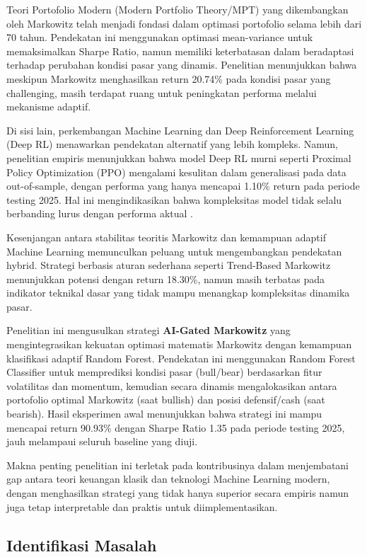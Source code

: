 \documentclass[12pt,a4paper]{article}
\begin{document}
Teori Portofolio Modern (Modern Portfolio Theory/MPT) yang dikembangkan oleh Markowitz \cite{markowitz1952portfolio} telah menjadi fondasi dalam optimasi portofolio selama lebih dari 70 tahun. Pendekatan ini menggunakan optimasi mean-variance untuk memaksimalkan Sharpe Ratio, namun memiliki keterbatasan dalam beradaptasi terhadap perubahan kondisi pasar yang dinamis. Penelitian menunjukkan bahwa meskipun Markowitz menghasilkan return 20.74\% pada kondisi pasar yang challenging, masih terdapat ruang untuk peningkatan performa melalui mekanisme adaptif.

Di sisi lain, perkembangan Machine Learning dan Deep Reinforcement Learning (Deep RL) menawarkan pendekatan alternatif yang lebih kompleks. Namun, penelitian empiris menunjukkan bahwa model Deep RL murni seperti Proximal Policy Optimization (PPO) mengalami kesulitan dalam generalisasi pada data out-of-sample, dengan performa yang hanya mencapai 1.10\% return pada periode testing 2025. Hal ini mengindikasikan bahwa kompleksitas model tidak selalu berbanding lurus dengan performa aktual \cite{arulkumaran2017deep}.

Kesenjangan antara stabilitas teoritis Markowitz dan kemampuan adaptif Machine Learning memunculkan peluang untuk mengembangkan pendekatan hybrid. Strategi berbasis aturan sederhana seperti Trend-Based Markowitz menunjukkan potensi dengan return 18.30\%, namun masih terbatas pada indikator teknikal dasar yang tidak mampu menangkap kompleksitas dinamika pasar.

Penelitian ini mengusulkan strategi \textbf{AI-Gated Markowitz} yang mengintegrasikan kekuatan optimasi matematis Markowitz dengan kemampuan klasifikasi adaptif Random Forest. Pendekatan ini menggunakan Random Forest Classifier untuk memprediksi kondisi pasar (bull/bear) berdasarkan fitur volatilitas dan momentum, kemudian secara dinamis mengalokasikan antara portofolio optimal Markowitz (saat bullish) dan posisi defensif/cash (saat bearish). Hasil eksperimen awal menunjukkan bahwa strategi ini mampu mencapai return 90.93\% dengan Sharpe Ratio 1.35 pada periode testing 2025, jauh melampaui seluruh baseline yang diuji.

Makna penting penelitian ini terletak pada kontribusinya dalam menjembatani gap antara teori keuangan klasik dan teknologi Machine Learning modern, dengan menghasilkan strategi yang tidak hanya superior secara empiris namun juga tetap interpretable dan praktis untuk diimplementasikan.

\subsection{Identifikasi Masalah}
\end{document}
